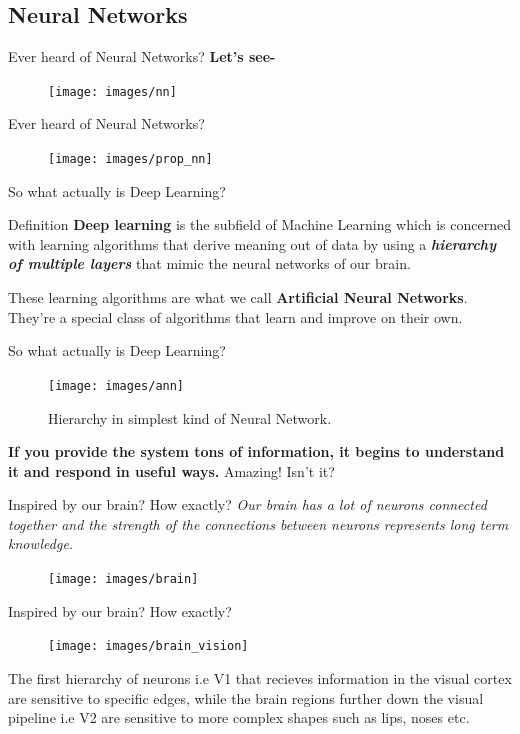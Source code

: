 \documentclass[10pt]{beamer}
\begin{document}
	\subsection{Neural Networks}
	\begin{frame}[c]{Ever heard of Neural Networks?}
	\large{\textbf{Let's see-}}
		\begin{figure}
			\texttt{[image: images/nn]}
		\end{figure}
	\end{frame}
	\begin{frame}[c]{Ever heard of Neural Networks?}
	\begin{figure}
		\texttt{[image: images/prop\_nn]}
	\end{figure}
	\end{frame}
	\begin{frame}{So what actually is Deep Learning?}
		\begin{block}{Definition}
			\textbf{Deep learning} is the subfield of Machine Learning which is concerned with learning algorithms that derive meaning out of data by using a \textbf{\textit{hierarchy of multiple layers}} that \alert{mimic the neural networks of our brain}.
		\end{block}
		\bigskip
		These learning algorithms are what we call \textbf{Artificial Neural Networks}. They're a special class of algorithms that learn and improve on their own.
	\end{frame}	
	\begin{frame}{So what actually is Deep Learning?}	
		\begin{figure}
			\texttt{[image: images/ann]}
			\caption{Hierarchy in simplest kind of Neural Network.}
		\end{figure}
		\pause
		\textbf {If you provide the system tons of information, it begins to understand it and respond in useful ways.}
		\pause
		\alert {Amazing! Isn't it?}
	\end{frame}
	\begin{frame}[c]{Inspired by our brain? How exactly?}
		\large{\textit{Our brain has a lot of neurons connected together and the strength of the connections between neurons represents long term knowledge.}}
		\begin{figure}
			\texttt{[image: images/brain]}
		\end{figure}
	\end{frame}
	\begin{frame}[c]{Inspired by our brain? How exactly?}
		\begin{figure}
			\texttt{[image: images/brain\_vision]}
		\end{figure}
		The first hierarchy of neurons i.e \alert{V1} that recieves information in the visual cortex are sensitive to specific edges, while the brain regions further down the visual pipeline i.e \alert{V2} are sensitive to more complex shapes such as lips, noses etc.
	\end{frame}
\end{document}
